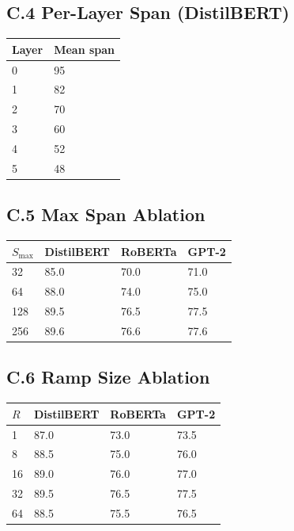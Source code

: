 \subsection{C.4 Per-Layer Span (DistilBERT)}

\begin{table}[H]
\centering
\small
\begin{tabular}{ll}
\toprule
\textbf{Layer} & \textbf{Mean span} \\
\midrule
0 & 95 \\
1 & 82 \\
2 & 70 \\
3 & 60 \\
4 & 52 \\
5 & 48 \\
\bottomrule
\end{tabular}
\end{table}

\subsection{C.5 Max Span Ablation}

\begin{table}[H]
\centering
\small
\begin{tabular}{llll}
\toprule
\textbf{$S_\text{max}$} & \textbf{DistilBERT} & \textbf{RoBERTa} & \textbf{GPT-2} \\
\midrule
32 & 85.0 & 70.0 & 71.0 \\
64 & 88.0 & 74.0 & 75.0 \\
128 & 89.5 & 76.5 & 77.5 \\
256 & 89.6 & 76.6 & 77.6 \\
\bottomrule
\end{tabular}
\end{table}

\subsection{C.6 Ramp Size Ablation}

\begin{table}[H]
\centering
\small
\begin{tabular}{llll}
\toprule
\textbf{$R$} & \textbf{DistilBERT} & \textbf{RoBERTa} & \textbf{GPT-2} \\
\midrule
1 & 87.0 & 73.0 & 73.5 \\
8 & 88.5 & 75.0 & 76.0 \\
16 & 89.0 & 76.0 & 77.0 \\
32 & 89.5 & 76.5 & 77.5 \\
64 & 88.5 & 75.5 & 76.5 \\
\bottomrule
\end{tabular}
\end{table}

